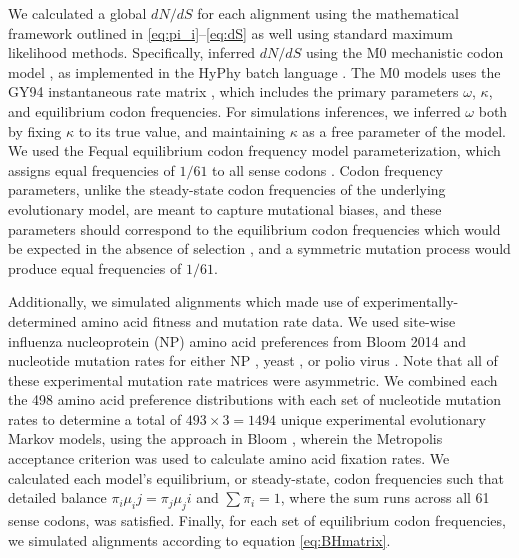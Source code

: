 \documentclass[11pt]{article}
\begin{document}
We calculated a global $dN/dS$ for each alignment using the mathematical framework outlined in \eqref{eq:pi_i}--\eqref{eq:dS} as well using standard maximum likelihood methods. Specifically, inferred $dN/dS$ using the M0 mechanistic codon model \cite{Yangetal2000}, as implemented in the HyPhy batch language \cite{KosakovskyPondetal2005}. The M0 models uses the GY94 instantaneous rate matrix \cite{GoldmanYang1994,NielsenYang1998}, which includes the primary parameters $\omega$, $\kappa$, and equilibrium codon frequencies. For simulations inferences, we inferred $\omega$ both by fixing $\kappa$ to its true value, and maintaining $\kappa$ as a free parameter of the model. We used the Fequal equilibrium codon frequency model parameterization, which assigns equal frequencies of $1/61$ to all sense codons \cite{Yang2006}. Codon frequency parameters, unlike the steady-state codon frequencies of the underlying evolutionary model, are meant to capture mutational biases, and these parameters should correspond to the equilibrium codon frequencies which would be expected in the absence of selection \cite{YN00}, and a symmetric mutation process would produce equal frequencies of $1/61$.


Additionally, we simulated alignments which made use of experimentally-determined amino acid fitness and mutation rate data. We used site-wise influenza nucleoprotein (NP) amino acid preferences from Bloom 2014 \cite{Bloom2014a} and nucleotide mutation rates for either NP \cite{Bloom2014a}, yeast \cite{Zhu2014}, or polio virus \cite{Acevedo2014}. Note that all of these experimental mutation rate matrices were asymmetric. We combined each the 498 amino acid preference distributions with each set of nucleotide mutation rates to determine a total of $493 \times 3 = 1494$ unique experimental evolutionary Markov models, using the approach in Bloom \cite{Bloom2014a}, wherein the Metropolis acceptance criterion \cite{Metropolis1953} was used to calculate amino acid fixation rates. We calculated each model's equilibrium, or steady-state, codon frequencies such that detailed balance $\pi_i\mu_ij = \pi_j\mu_ji$ and $\sum\pi_i = 1$, where the sum runs across all 61 sense codons, was satisfied. Finally, for each set of equilibrium codon frequencies, we simulated alignments according to equation \eqref{eq:BHmatrix}.
\end{document}
